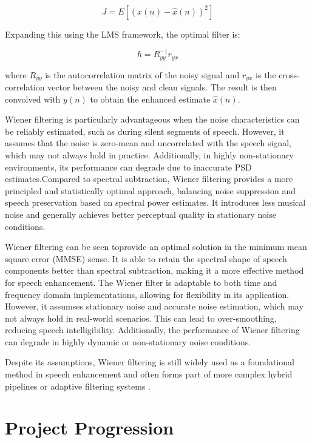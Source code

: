 \begin{equation}
    J = E\left[ (x(n) - \hat{x}(n))^2 \right]
\end{equation}

Expanding this using the LMS framework, the optimal filter is:

\begin{equation}
    h = R_{yy}^{-1} r_{yx}
\end{equation}

where \( R_{yy} \) is the autocorrelation matrix of the noisy signal and \( r_{yx} \) is the cross-correlation vector between the noisy and clean signals. The result is then convolved with \( y(n) \) to obtain the enhanced estimate \( \hat{x}(n) \).

Wiener filtering is particularly advantageous when the noise characteristics can be reliably estimated, such as during silent segments of speech. However, it assumes that the noise is zero-mean and uncorrelated with the speech signal, which may not always hold in practice. Additionally, in highly non-stationary environments, its performance can degrade due to inaccurate PSD estimates.Compared to spectral subtraction, Wiener filtering provides a more principled and statistically optimal approach, balancing noise suppression and speech preservation based on spectral power estimates. It introduces less musical noise and generally achieves better perceptual quality in stationary noise conditions.

Wiener filtering can be seen toprovide an optimal solution in the minimum mean square error (MMSE) sense. It is able to retain the spectral shape of speech components better than spectral subtraction, making it a more effective method for speech enhancement. The Wiener filter is adaptable to both time and frequency domain implementations, allowing for flexibility in its application. However, it assumses stationary noise and accurate noise estimation, which may not always hold in real-world scenarios. This can lead to over-smoothing, reducing speech intelligibility. Additionally, the performance of Wiener filtering can degrade in highly dynamic or non-stationary noise conditions.

Despite its assumptions, Wiener filtering is still widely used as a foundational method in speech enhancement and often forms part of more complex hybrid pipelines or adaptive filtering systems \cite{dubey2016evaluation, loizou2013speech}.

\section{Project Progression}
\label{sec:project_progression}

